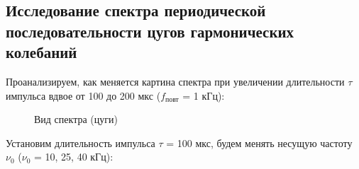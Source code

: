 \documentclass[a4paper, 12pt]{article}
\begin{document}
\subsection*{Исследование спектра периодической последовательности цугов гармонических колебаний} 

Проанализируем, как меняется картина спектра при увеличении длительности $\tau$ импульса вдвое от 100 до 200 мкс ($f_\text{повт}$ = 1 кГц):

\begin{figure}[h!]
	\centering
\caption{Вид спектра (цуги)}
\end{figure}

Установим длительность импульса $\tau$ = 100 мкс, будем менять несущую частоту $\nu_0$ ($\nu_0$ = 10, 25, 40 кГц):
\end{document}
